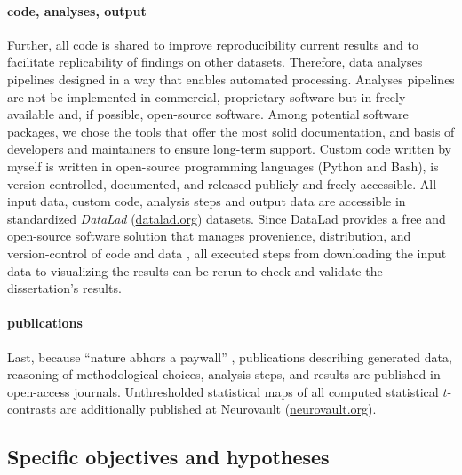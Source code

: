 \paragraph{code, analyses, output}

Further, all code is shared to improve reproducibility current results and to
facilitate replicability of findings on other datasets.
Therefore, data analyses pipelines designed in a way that enables automated
processing.
%
Analyses pipelines are not be implemented in commercial, proprietary software
but in freely available and, if possible, open-source software.
Among potential software packages, we chose the tools that offer the most solid
documentation, and basis of developers and maintainers to ensure long-term
support.
Custom code written by myself is written in open-source programming languages
(Python and Bash), is version-controlled, documented, and released publicly and
freely accessible.
%
All input data, custom code, analysis steps and output data are accessible in
standardized \textit{DataLad} (\href{www.datalad.org}{datalad.org}) datasets.
Since DataLad provides a free and open-source software solution that manages
provenience, distribution, and version-control of code and data
\citep{halchenko2021datalad}, all executed steps from downloading the input data
to visualizing the results can be rerun to check and validate the dissertation's
results.


\paragraph{publications}
Last, because ``nature abhors a paywall'' \citep{dupre2020nature}, publications
describing generated data, reasoning of methodological choices, analysis steps,
and results are published in open-access journals.
Unthresholded statistical maps of all computed statistical $t$-contrasts are
additionally published at Neurovault
(\href{https://neurovault.org/}{neurovault.org}).


\subsection{Specific objectives and hypotheses}




